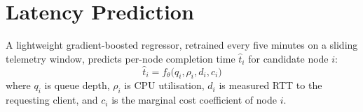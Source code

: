 \section{Latency Prediction}
A lightweight gradient-boosted regressor, retrained every five minutes on a sliding telemetry window, predicts per-node completion time $\hat{t}_{i}$ for candidate node $i$:
\begin{equation}
\hat{t}_{i} = f_\theta\big(q_i, \rho_i, d_i, c_i\big)
\label{eq:predictor}
\end{equation}
where $q_i$ is queue depth, $\rho_i$ is CPU utilisation, $d_i$ is measured RTT to the requesting client, and $c_i$ is the marginal cost coefficient of node $i$.
